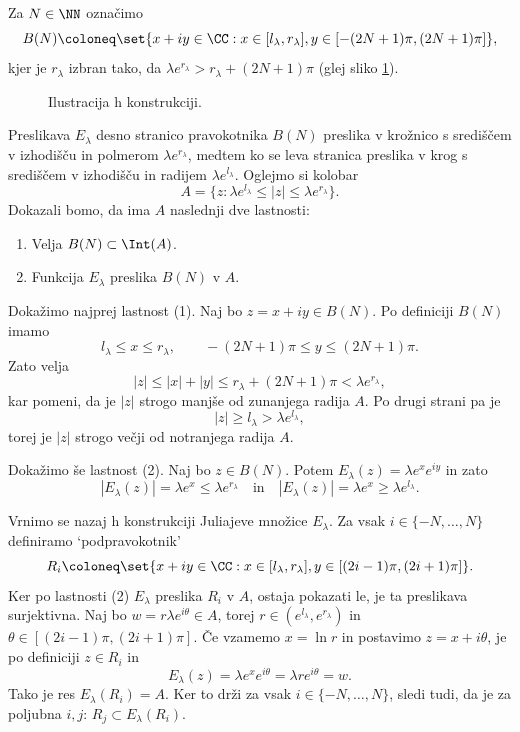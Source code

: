 Za \(N \in \NN\) označimo
\[B(N) \coloneq \set{x + iy \in \CC : x \in [l_\lambda, r_\lambda], y \in [- (2N + 1) \pi, (2N + 1) \pi]},\]
kjer je \(r_\lambda\) izbran tako, da \(\lambda e^{r_\lambda} > r_\lambda + (2N + 1) \pi\) (glej sliko \ref{fig:konstrukcija}).
\begin{figure}%
    \centering
    
    \caption{Ilustracija h konstrukciji.}
    \label{fig:konstrukcija}
\end{figure}
Preslikava \(E_\lambda\) desno stranico pravokotnika \(B (N)\) preslika v krožnico s središčem v izhodišču in polmerom \(\lambda e^{r_\lambda}\), medtem ko se leva stranica preslika v krog s središčem v izhodišču in radijem \(\lambda e^{l_\lambda}\). Oglejmo si kolobar
\[A = \{z : \lambda e^{l_\lambda} \leq |z| \leq \lambda e^{r_\lambda}\}.\]
Dokazali bomo, da ima \(A\) naslednji dve lastnosti:

\begin{enumerate}[label=(\arabic*)]
    \item Velja \(B (N) \subset \Int (A)\).
    \item Funkcija \(E_\lambda\) preslika \(B (N)\) v \(A\).
\end{enumerate}

\noindent Dokažimo najprej lastnost (1). Naj  bo \(z = x + i y \in B (N)\). Po definiciji \(B (N)\) imamo
\[l_\lambda \leq x \leq r_\lambda, \qquad - (2N + 1) \pi \leq y \leq (2N + 1) \pi.\]
Zato velja
\[|z| \leq |x| + |y| \leq r_\lambda + (2N + 1) \pi < \lambda e^{r_\lambda},\]
kar pomeni, da je \(|z|\) strogo manjše od zunanjega radija \(A\). Po drugi strani pa je
\[|z| \geq l_\lambda > \lambda e^{l_\lambda},\]
torej je \(|z|\) strogo večji od notranjega radija \(A\).

Dokažimo še lastnost (2). Naj bo \(z \in B (N)\). Potem \(E_\lambda (z) = \lambda e^x e^{i y}\) in zato
\[|E_\lambda (z)| = \lambda e^x \leq \lambda e^{r_\lambda} \quad \text{in} \quad |E_\lambda (z)| = \lambda e^x \geq \lambda e^{l_\lambda}.\]

Vrnimo se nazaj h konstrukciji Juliajeve množice \(E_\lambda\). Za vsak \(i \in \{ -N, \dots, N \}\) definiramo `podpravokotnik'
\[R_i \coloneq \set{x + iy \in \CC : x \in [l_\lambda, r_\lambda], y \in [(2i - 1) \pi, (2i + 1) \pi]}.\]
Ker po lastnosti (2) \(E_\lambda\) preslika \(R_i\) v \(A\), ostaja pokazati le, je ta preslikava surjektivna. Naj bo \(w = r \lambda e^{i \theta} \in A\), torej \(r \in (e^{l_\lambda}, e^{r_\lambda})\) in \(\theta \in [(2i - 1) \pi, (2i + 1) \pi]\). Če vzamemo \(x = \ln r\) in postavimo \(z = x + i \theta\), je po definiciji \(z \in R_i\) in
\[E_\lambda (z) = \lambda e^x e^{i \theta} = \lambda r e^{i \theta} = w.\]
Tako je res \(E_\lambda (R_i) = A\). Ker to drži za vsak \(i \in \{ -N, \dots, N \}\), sledi tudi, da je za poljubna \(i, j\): \(R_j \subset E_\lambda (R_i)\).

